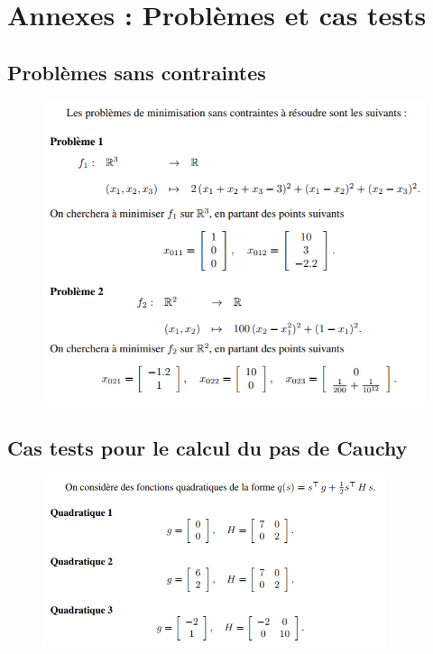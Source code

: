\documentclass[a4paper,12pt]{article}
\theoremstyle{break}
\begin{document}
\section{Annexes : Problèmes et cas tests}

\subsection{Problèmes sans contraintes}
\begin{figure}[htbp]
	\centering
		\includegraphics{img/problemes_sans_contraintes.PNG}
\end{figure}

\subsection{Cas tests pour le calcul du pas de Cauchy}
\begin{figure}[htbp]
	\centering
		\includegraphics[height=5cm]{img/cas_tests_pas_cauchy.PNG}
\end{figure}
\end{document}
